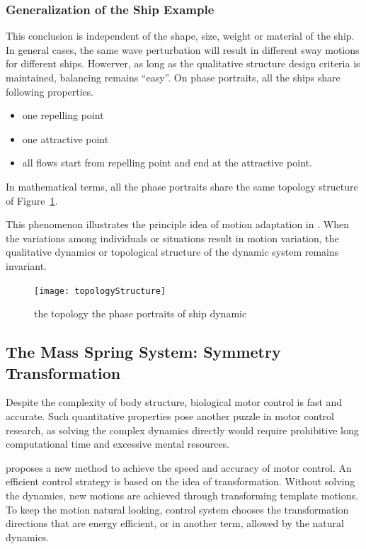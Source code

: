  



\subsubsection*{Generalization of the Ship Example} 
This conclusion is independent of the shape, size, weight or material of the ship. 
In general cases, the same wave perturbation will result in different sway motions for different ships.
Howerver, as long as the qualitative structure design criteria is maintained, balancing remains ``easy''.
On phase portraits,  all the ships share following properties. 
\begin{itemize}
\item one repelling point 
\item one attractive point 
\item all flows start from repelling point and end at the  attractive point. 
\end{itemize}

In mathematical terms, all the phase portraits share the same topology structure of Figure~\ref{fig:topologyStructure}.

This phenomenon illustrates the principle idea of motion adaptation in \moit.
When the variations among individuals or situations result in motion variation, the qualitative dynamics or topological structure of the dynamic system remains invariant.

\begin{figure}[!htbp]
  \begin{center}
   \texttt{[image: topologyStructure]}
   \caption{the topology  the phase portraits of ship dynamic}
   \label{fig:topologyStructure}
  \end{center}
\end{figure}




\subsection{The Mass Spring System:  Symmetry Transformation}
Despite the complexity of body structure, biological motor control is fast and accurate.
Such quantitative properties pose another puzzle in motor control research, as solving the complex dynamics directly would require prohibitive long computational time and excessive mental resources.

\moit proposes a new method to achieve the  speed and accuracy of motor control.
An efficient control strategy is based on the idea of transformation.
Without solving the dynamics, new motions are achieved through transforming template motions.
To keep the motion natural looking, control system chooses the transformation directions that are energy efficient, or in another term, allowed by the natural dynamics.


